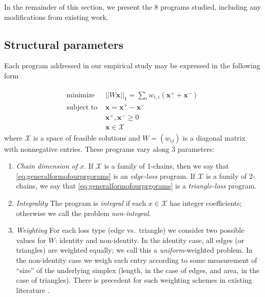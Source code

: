 \documentclass[utf8]{formatting_stuff/frontiersFPHY}
\newcommand{\optimalrep}{\mathbf{x}}
\newcommand{\feasibleset}{\mathcal{X}}
\theoremstyle{plain}
\theoremstyle{definition}
\begin{document}
In the remainder of this section, we present the 8 programs studied, including any modifications from existing work.

\subsection{Structural parameters}
\label{sec_structuralparams}

Each program addressed in our empirical study may be expressed in the following form
 
\begin{align}
\begin{split}
    \text{minimize } & || W \optimalrep||_1 = \sum_i w_{i,i} (\optimalrep^+ + \optimalrep^-) \\
    \text{subject to } 
    & \optimalrep = \optimalrep^+ - \optimalrep^- \\
    & \optimalrep^+, \optimalrep^- \ge 0 \\
    & \optimalrep \in \feasibleset
\end{split}
\label{eq:generalformofourprgorams}
\end{align}
where $\feasibleset$ is a space of feasible solutions and $W = (w_{ij})$ is a diagonal matrix with nonnegative entries.  These programs vary along 3 parameters:
    \begin{enumerate}
        \item \emph{Chain dimension of $x$}.  If $\feasibleset$ is a family of 1-chains, then we say that \eqref{eq:generalformofourprgorams} is an \emph{edge-loss} program.  If $\feasibleset$ is a family of 2-chains, we say that \eqref{eq:generalformofourprgorams} is a \emph{triangle-loss} program.
        
        \item \emph{Integrality}  The program is \emph{integral} if each $x \in \feasibleset$ has integer coefficients; otherwise we call the problem \emph{non-integral}.
        
        \item \emph{Weighting}  For each loss type (edge vs.\ triangle) we consider two possible values for $W$: identity and non-identity.  In the identity case, all edges (or triangles) are weighted equally; we call this a \emph{uniform}-weighted problem.  In the non-identity case we weigh each entry according to some measurement of ``size'' of the underlying simplex (length, in the case of edges, and area, in the case of triangles).  There is precedent for such weighting schemes in existing literature \cite{dey2011optimal, chenquantifying}.
    \end{enumerate}
\end{document}
